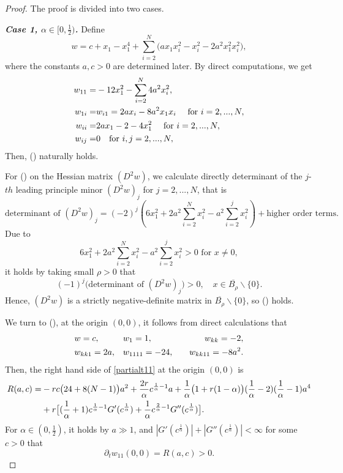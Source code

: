 \documentclass[10pt,a4paper]{amsart}
\begin{document}
\begin{proof}
The proof is divided into two cases. 

\noindent\textbf{\emph{Case 1, $\alpha\in[0,\frac{1}{2})$.}} Define 
\begin{equation}\label{w}w=c+x_1-x_1^4+\sum\limits_{i=2}^{N}(ax_1x_i^2-x_i^2-2a^2x_1^2x_i^2\big),\end{equation}
where the constants $a,c>0$ are determined later. By direct computations, we get 
\begin{align}
 w_{11}=&-12x_1^2-\sum\limits_{i=2}^{N}4a^2x_i^2,\notag\\
 w_{1i}=&w_{i1}=2ax_i-8a^2x_1x_i\quad \text{ for }i=2,...,N,\notag\\
 w_{ii}=&2a x_1-2-4x_1^2\quad \text{ for }i=2,...,N,\notag\\
 w_{ij}=&0\quad \text{for }i,j=2,...,N,\notag
\end{align}
Then, (\expandafter{}) naturally holds.

\vspace{2mm}

For (\expandafter{}) on the Hessian matrix $(D^2w)$, we calculate directly determinant of the $j$-$th$ leading principle minor $(D^2w)_j$ for $j=2,...,N$, that is   
\[\text{determinant of } (D^2w)_j=(-2)^{j}(6x_1^2+2a^2\sum\limits_{i=2}^Nx_i^2-a^2\sum\limits_{i=2}^{j}x_i^2)+\text{higher order terms}.\]
Due to
\[6x_1^2+2a^2\sum\limits_{i=2}^Nx_i^2-a^2\sum\limits_{i=2}^{j}x_i^2>0 \text{ for }x\neq0, \]
it holds by taking small $\rho>0$ that 
\[(-1)^j\big(\text{determinant of } (D^2w)_j\big)>0,\quad x\in \overline{B_{\rho}}\backslash\{0\}.\]
Hence, $(D^2w)$ is a strictly negative-definite matrix in $\overline{B_{\rho}}\backslash\{0\}$, so (\expandafter{}) holds.


\vspace{2mm}

We turn to (\expandafter{}), at the origin $(0,0)$, it follows from direct calculations that  
\begin{align}
&w=c,         &&w_{1}=1,         &&&w_{kk}=-2,\notag\\
&w_{kk1}=2a,  &&w_{1111}=-24,      &&&w_{kk11}=-8a^2.\notag
\end{align}
Then,  the right hand side of \eqref{partialt11} at the origin $(0,0)$ is 
\begin{align}R(a,c)=&-rc\big(24+8(N-1)\big)a^2+\frac{2r}{\alpha}c^{\frac{1}{\alpha}-1}a+\frac{1}{\alpha}\big(1+r(1-\alpha)\big)(\frac{1}{\alpha}-2)(\frac{1}{\alpha}-1)a^4\notag\\
&+r\big[(\frac{1}{\alpha}+1)c^{\frac{1}{\alpha}-1}G'(c^{\frac{1}{\alpha}})+\frac{1}{\alpha}c^{\frac{2}{\alpha}-1}G''(c^{\frac{1}{\alpha}})\big].\notag\end{align}
For $\alpha\in (0,\frac{1}{2})$, it holds by $a\gg1$, and $|G'(c^{\frac{1}{\alpha}})|+|G''(c^{\frac{1}{\alpha}})|<\infty$ for some $c>0$ that 
\begin{equation}\label{012}
\partial_t w_{11}(0,0)=R(a,c)>0.
\end{equation}


\end{proof}
\end{document}
